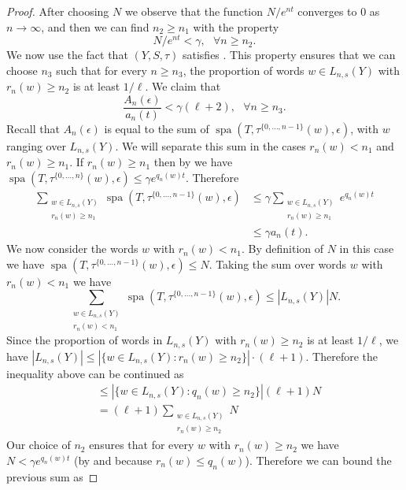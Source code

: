 \documentclass[a4paper,oneside]{amsart}
\renewcommand{\(}{\begin{dmath*}}
\renewcommand{\)}{\end{dmath*}}
\theoremstyle{definition}
\newcommand{\spa}{\operatorname{spa}}
\begin{document}
\begin{proof}
    After choosing $N$ we observe that the function $N/e^{nt}$ converges to $0$ as $n\to\infty$, and then we can find $n_2\geq n_1$ with the property 
    \begin{equation}\label{property-of-n2}
    N/e^{nt}<\gamma, \ \ \ \forall n\geq n_2.\end{equation}
    We now use the fact that $(Y,S,\tau)$ satisfies  . This property ensures that we can choose $n_3$ such that for every $n\geq n_3$, the proportion of words $w\in L_{n,s}(Y)$ with $r_n(w)\geq n_2$ is at least $1/\ell$. We claim that \begin{equation}\label{bound-A_n/a_n}\frac{A_n(\epsilon)}{a_n(t)}<\gamma(\ell+2), \ \ \ \forall n\geq n_3.\end{equation}
    Recall that $A_n(\epsilon)$ is equal to the sum of $\spa(T,\tau^{\{0,\dots,n-1\}}(w),\epsilon)$, with $w$ ranging over $L_{n,s}(Y)$. We will separate this sum in the cases $r_n(w)<n_1$ and $r_n(w)\geq n_1$. If $r_n(w)\geq n_1$ then by  we have  
    $\spa(T,\tau^{\{0,\dots,n\}}(w),\epsilon)\leq \gamma e^{q_n(w)t}$. Therefore \begin{align*}\sum_{\substack{w\in L_{n,s}(Y)\\ r_n(w)\geq n_1}}\spa(T,\tau^{\{0,\dots,n-1\}}(w),\epsilon)&\leq \gamma\sum_{\substack{w\in L_{n,s}(Y)\\ r_n(w)\geq n_1}} e^{q_n(w)t} \\ &\leq \gamma a_n(t).
    \end{align*}
    We now consider the  words $w$ with $r_n(w)< n_1$.  By definition of $N$ in this case we have $\spa(T,\tau^{\{0,\dots,n-1\}}(w),\epsilon)\leq N$. Taking the sum over words $w$ with $r_n(w)< n_1$ we have
    \[\sum_{\substack{w\in L_{n,s}(Y)\\ r_n(w)< n_1}}\spa(T,\tau^{\{0,\dots,n-1\}}(w),\epsilon)\leq |L_{n,s}(Y)|N.
    \]
    Since the proportion of words in $L_{n,s}(Y)$ with $r_n(w)\geq n_2$ is at least $1/\ell$, we have $|L_{n,s}(Y)|\leq |\{w\in L_{n,s}(Y) : r_n(w)\geq n_2\}|\cdot (\ell+1)$. Therefore the inequality above can be continued as
    \begin{align*}
    &\leq |\{w\in L_{n,s}(Y) : q_n(w)\geq n_2\}| (\ell+1) N\\&=(\ell+1)\sum_{\substack{w\in L_{n,s}(Y)\\ r_n(w)\geq  n_2}} N
    \end{align*}
    Our choice of $n_2$ ensures that for every $w$ with $r_n(w)\geq n_2$ we have $N<\gamma e^{q_n(w)t}$ (by  and because  $r_n(w)\leq q_n(w)$). Therefore we can bound the previous sum as 

\end{proof}
\end{document}
